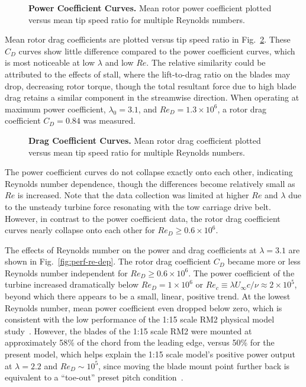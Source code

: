 \documentclass[10pt,letterpaper]{article}
\begin{document}
\begin{figure}

    \caption{{\bf Power Coefficient Curves.} Mean rotor power coefficient
    plotted versus mean tip speed ratio for multiple Reynolds numbers.}

    \label{fig:cp-curves}
\end{figure}

Mean rotor drag coefficients are plotted versus tip speed ratio in
Fig.~\ref{fig:cd-curves}. These $C_D$ curves show little difference compared to
the power coefficient curves, which is most noticeable at low $\lambda$ and low
$Re$. The relative similarity could be attributed to the effects of stall, where
the lift-to-drag ratio on the blades may drop, decreasing rotor torque, though
the total resultant force due to high blade drag retains a similar component in
the streamwise direction. When operating at maximum power coefficient,
$\lambda_0=3.1$, and $Re_D=1.3 \times 10^6$, a rotor drag coefficient $C_D=0.84$
was measured.

\begin{figure}

    \caption{{\bf Drag Coefficient Curves.} Mean rotor drag coefficient plotted
    versus mean tip speed ratio for multiple Reynolds numbers.}

    \label{fig:cd-curves}
\end{figure}

The power coefficient curves do not collapse exactly onto each other, indicating
Reynolds number dependence, though the differences become relatively small as
$Re$ is increased. Note that the data collection was limited at higher $Re$ and
$\lambda$ due to the unsteady turbine force resonating with the tow carriage
drive belt. However, in contrast to the power coefficient data, the rotor drag
coefficient curves nearly collapse onto each other for $Re_D \ge 0.6 \times
10^6$.

The effects of Reynolds number on the power and drag coefficients at
$\lambda=3.1$ are shown in Fig.~\ref{fig:perf-re-dep}. The rotor drag
coefficient $C_D$ became more or less Reynolds number independent for $Re_D \ge
0.6 \times 10^6$. The power coefficient of the turbine increased dramatically
below $Re_D = 1 \times 10^6$ or $Re_c \equiv \lambda U_\infty c / \nu \approx 2
\times 10^5$, beyond which there appears to be a small, linear, positive trend.
At the lowest Reynolds number, mean power coefficient even dropped below zero,
which is consistent with the low performance of the 1:15 scale RM2 physical
model study~\cite{Hill2014}. However, the blades of the 1:15 scale RM2 were
mounted at approximately 58\% of the chord from the leading edge, versus 50\%
for the present model, which helps explain the 1:15 scale model's positive power
output at $\lambda=2.2$ and $Re_D \sim 10^5$, since moving the blade mount point
further back is equivalent to a ``toe-out'' preset pitch
condition~\cite{Fiedler2009}.
\end{document}
